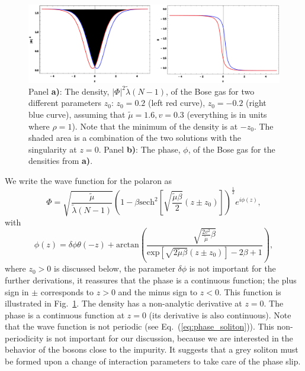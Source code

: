 \documentclass[twocolumn,amsmath,amssymb,showpacs,prl,superscriptaddress,aps]{revtex4-1}
\begin{document}
 \begin{figure}
 \centerline{\includegraphics[scale=0.45]{figure1appendix.pdf}}
 \caption{Panel {\bf a)}: The density, $|\Phi|^2 \tilde \lambda (N-1)$, of the Bose gas for two different parameters $z_0$: $z_0=0.2$ (left red curve), $z_0=-0.2$ (right blue curve), 
 assuming that $\tilde \mu=1.6, v=0.3$ (everything is in units where $\rho=1$). 
 Note that the minimum of the density is at $-z_0$. The shaded area is a combination of the two solutions with the singularity at $z=0$. Panel {\bf b)}: The phase, $\phi$, of the Bose gas for the densities from {\bf a)}.}
 \label{fig:Fig1}
 \end{figure}

We write the wave function for the polaron as
\begin{equation}
\Phi=\sqrt{\frac{\tilde \mu}{\tilde \lambda (N-1)}}\left(1-\beta \mathrm{sech}^2\left[\sqrt{\frac{\tilde\mu\beta}{2}}(z\pm z_0)\right]\right)^{\frac{1}{2}}e^{i\phi(z)},
\end{equation}
with 
\begin{equation}
\phi(z)=\delta \phi \theta(-z)+\mathrm{arctan}\left(\frac{\sqrt{\frac{2 v^2}{\tilde \mu}\beta}}{\mathrm{exp}\left[\sqrt{2\tilde \mu\beta}(z\pm z_0)\right]-2\beta+1}\right),
\label{eq:phase_soliton}
\end{equation}
where $z_0>0$ is discussed below, the parameter $\delta \phi$ is not important for the further derivations, it reassures that the phase is a continuous function;
the plus sign in $\pm$ corresponds to $z>0$ and the minus sign to $z<0$. This function is illustrated in Fig.~\ref{fig:Fig1}. 
The density has a non-analytic derivative at $z=0$. The phase is a continuous function at $z=0$ (its derivative is also continuous).
Note that the wave function is not periodic (see Eq.~(\ref{eq:phase_soliton})). This non-periodicity is not important 
for our discussion, because we are interested in the behavior of the bosons close to the impurity. It suggests that a grey soliton
must be formed upon a change of interaction parameters to take care of the phase slip.
\end{document}
